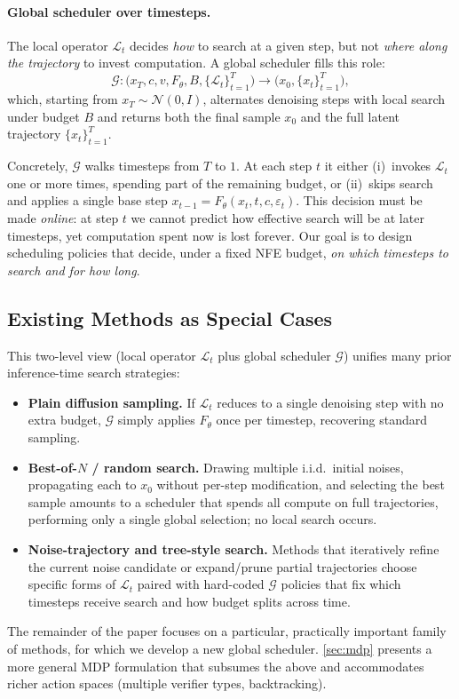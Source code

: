\paragraph{Global scheduler over timesteps.}
The local operator $\mathcal{L}_t$ decides \emph{how} to search at a given
step, but not \emph{where along the trajectory} to invest computation.
A global scheduler fills this role:
\[
  \mathcal{G} :
  \bigl(x_T, c, v, F_\theta, B, \{\mathcal{L}_t\}_{t=1}^T\bigr)
  \longrightarrow \bigl(x_0, \{x_t\}_{t=1}^T\bigr),
\]
which, starting from $x_T \sim \mathcal{N}(0, I)$, alternates
denoising steps with local search under budget $B$ and
returns both the final sample $x_0$ and the full latent trajectory
$\{x_t\}_{t=1}^T$.

Concretely, $\mathcal{G}$ walks timesteps from $T$ to $1$.
At each step $t$ it either
(i)~invokes $\mathcal{L}_t$ one or more times, spending
part of the remaining budget, or
(ii)~skips search and applies a single base step
$x_{t-1} = F_\theta(x_t, t, c, \varepsilon_t)$.
This decision must be made \emph{online}: at step $t$
we cannot predict how effective search will be at later timesteps, yet
computation spent now is lost forever.
Our goal is to design scheduling policies that decide, under a fixed NFE
budget, \emph{on which timesteps to search and for how long}.

\subsection{Existing Methods as Special Cases}
\label{sec:special-cases}

This two-level view (local operator $\mathcal{L}_t$ plus global scheduler
$\mathcal{G}$) unifies many prior
inference-time search strategies:
\begin{itemize}
  \item \textbf{Plain diffusion sampling.}
  If $\mathcal{L}_t$ reduces to a single denoising step with no extra budget,
  $\mathcal{G}$ simply applies $F_\theta$ once per
  timestep, recovering standard sampling.
  \item \textbf{Best-of-$N$ / random search.}
  Drawing multiple i.i.d.\ initial noises, propagating each to $x_0$ without
  per-step modification, and selecting the best sample amounts to a
  scheduler that spends all compute on full trajectories, performing only
  a single global selection; no local search occurs.
  \item \textbf{Noise-trajectory and tree-style search.}
  Methods that iteratively refine the current noise candidate or expand/prune partial
  trajectories choose specific
  forms of $\mathcal{L}_t$ paired with hard-coded $\mathcal{G}$ policies that
  fix which timesteps receive search and how budget splits across time.
\end{itemize}
The remainder of the paper focuses on a particular, practically
important family of methods, for which we develop a new global scheduler.
\cref{sec:mdp} presents a more general MDP formulation that subsumes the
above and accommodates richer action spaces (multiple verifier types,
backtracking).

